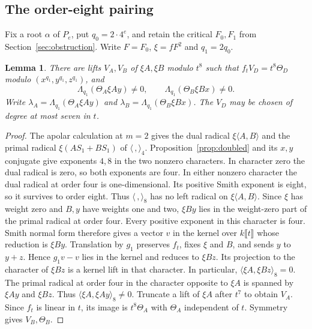 \documentclass[11pt,a4paper,reqno]{amsart}
\numberwithin{equation}{section}
\theoremstyle{plain}
\newtheorem{lemma}[theorem]{Lemma}
\theoremstyle{definition}
\theoremstyle{remark}
\begin{document}
\subsection{The order-eight pairing}
Fix a root $\alpha$ of $P_e$, put $q_0=2\cdot4^e$, and retain the
critical $F_0,F_1$ from Section~\ref{sec:obstruction}. Write $F=F_0$,
$\xi=fF^2$ and $q_1=2q_0$.
\begin{lemma}\label{lem:order-eight}
There are lifts $V_A,V_B$ of $\xi A,\xi B$ modulo $t^8$ such that
$f_tV_D=t^8\Theta_D$ modulo $(x^{q_1},y^{q_1},z^{q_1})$, and
\[
\Lambda_{q_1}(\Theta_A\xi Ay)\ne0,\qquad
\Lambda_{q_1}(\Theta_B\xi Bx)\ne0.
\]
Write $\lambda_A=\Lambda_{q_1}(\Theta_A\xi Ay)$ and $\lambda_B=\Lambda_{q_1}(\Theta_B\xi Bx)$.
The $V_D$ may be chosen of degree at most seven in $t$.
\end{lemma}
\begin{proof}
The apolar calculation at $m=2$ gives the dual radical
$\xi\langle A,B\rangle$ and the primal radical $\xi(AS_1+BS_1)$ of
$\langle\,,\rangle_4$. Proposition~\ref{prop:doubled} and its $x,y$ conjugate give
exponents $4,8$ in the two nonzero characters. In character zero the dual
radical is zero, so both exponents are four. In either nonzero character the dual radical at order four is one-dimensional. Its positive Smith exponent is eight, so it survives to order eight. Thus $\langle\,,\rangle_8$ has no left radical on
$\xi\langle A,B\rangle$.
Since $\xi$ has weight zero and $B,y$ have weights one and two,
$\xi By$ lies in the weight-zero part of the primal radical at order four.
Every positive exponent in this character is four. Smith normal form
therefore gives a vector $v$ in the kernel over $k\llbracket t\rrbracket$
whose reduction is $\xi By$. Translation by $g_1$ preserves $f_t$,
fixes $\xi$ and $B$, and sends $y$ to $y+z$. Hence $g_1v-v$ lies
in the kernel and reduces to $\xi Bz$. Its projection to the character
of $\xi Bz$ is a kernel lift in that character. In particular,
$\langle\xi A,\xi Bz\rangle_8=0$. The primal radical at order four
in the character opposite to $\xi A$ is spanned by $\xi Ay$ and $\xi Bz$.
Thus $\langle\xi A,\xi Ay\rangle_8\ne0$. Truncate a lift of $\xi A$ after $t^7$
to obtain $V_A$. Since $f_t$ is linear in $t$, its image is $t^8\Theta_A$
with $\Theta_A$ independent of $t$. Symmetry gives $V_B,\Theta_B$.
\end{proof}
\end{document}
